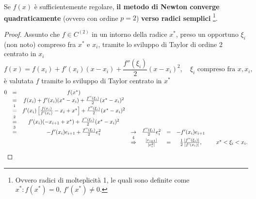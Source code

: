 \begin{theorem}\label{th:metodo_newton_converge_quadraticamente}
	Se $f(x)$ è sufficientemente regolare, \textbf{il metodo di Newton converge quadraticamente} (ovvero con ordine $p=2$) \textbf{verso radici semplici} \footnote{Ovvero radici di molteplicità 1, le quali sono definite come $x^*:f(x^*)=0,\, f'(x^*)\neq 0$.}.
\end{theorem}
\begin{proof}
	Assunto che $f\in C^{(2)}$ in un intorno della radice $x^*$, preso un opportuno $\xi_i$ (non noto) compreso fra $x^*$ e $x_i$, tramite lo sviluppo di Taylor di ordine 2 centrato in $x_i$
	\begin{equation*}
		f(x)=f(x_i)+f'(x_i)(x-x_i)+\frac{f''(\xi_i)}{2}(x-x_i)^2, \quad \xi_i \text{ compreso fra }x,x_i,
	\end{equation*}
	è valutata $f$ tramite lo sviluppo di Taylor centrato in $x^*$
	\begin{equation*}
		\begin{matrix}
			0 &=& f(x^*)\\
			&=& f(x_i)+f'(x_i)(x^*-x_i)+\frac{f''(\xi_i)}{2}(x^*-x_i)^2 \\
			&\overset{\footnotemark}{=}& f'(x_i)\left[\frac{f(x_i)}{f'(x_i)}-x_i+x^*\right]+\frac{f''(\xi_i)}{2}(x^*-x_i)^2 \\
			&\overset{\footnotemark}{=}&f'(x_i)(-x_{i+1}+x^*)+\frac{f''(\xi_i)}{2}(x^*-x_i)^2\\
			&\overset{\footnotemark}{=}&-f'(x_i)e_{i+1}+\frac{f''(\xi_i)}{2}e_i^2 &\rightarrow&\frac{f''(\xi_i)}{2}e_i^2 &=& -f'(x_i)e_{i+1}\\
			&&&\overset{\footnotemark}{\Rightarrow}& \frac{|e_{i+1}|}{|e_i^2|} &=& \frac{1}{2}\frac{|f''(\xi_i)|}{|f'(x_i)|}, && x^*<\xi_i<x_i.
		\end{matrix}
	\end{equation*}
	\addtocounter{footnote}{-3}
	
	
	
	

\end{proof}
